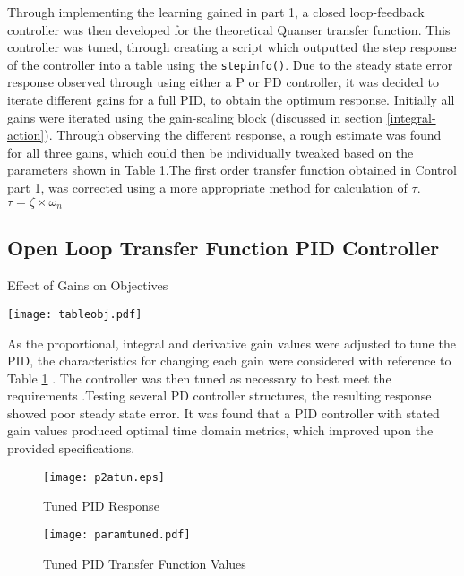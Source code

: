 Through implementing the learning gained in part 1, a closed
loop-feedback controller was then developed for the theoretical Quanser
transfer function. This controller was tuned, through creating a script
which outputted the step response of the controller into a table using
the \texttt{stepinfo()}. Due to the steady state error response observed
through using either a P or PD controller, it was decided to iterate
different gains for a full PID, to obtain the optimum response.
Initially all gains were iterated using the gain-scaling block
(discussed in section \ref{integral-action}). Through observing the
different response, a rough estimate was found for all three gains,
which could then be individually tweaked based on the parameters shown
in Table \ref{paramtab}.The first order transfer function obtained in
Control part 1, was corrected using a more appropriate method for
calculation of \(\tau\). \(\tau = \zeta \times \omega_n\)

\subsection{Open Loop Transfer Function PID
Controller}\label{open-loop-transfer-function-pid-controller}

\begin{wraptable}{l}{0.5\textwidth}
\vspace{-10pt}
\caption{Effect of Gains on Objectives}
\vspace{-5pt}
\centering
 \texttt{[image: tableobj.pdf]}
 \vspace{-15pt}
 \label{paramtab}
\end{wraptable}

As the proportional, integral and derivative gain values were adjusted
to tune the PID, the characteristics for changing each gain were
considered with reference to Table \ref{paramtab} . The controller was
then tuned as necessary to best meet the requirements .Testing several
PD controller structures, the resulting response showed poor steady
state error. It was found that a PID controller with stated gain values
produced optimal time domain metrics, which improved upon the provided
specifications.

\begin{figure}[H]
\centering
\begin{minipage}{.55\textwidth}
 \centering
 \texttt{[image: p2atun.eps]}
 \vspace{-20pt}
 \caption{Tuned PID Response}
 \label{p2bres}
\end{minipage}
\hfill
\begin{minipage}{.35\textwidth}
\centering
\texttt{[image: paramtuned.pdf]}
\vspace{-10pt}
\caption{Tuned PID Transfer Function Values}
\label{paramtab}
\end{minipage}
\vspace{-20pt}
\end{figure}

